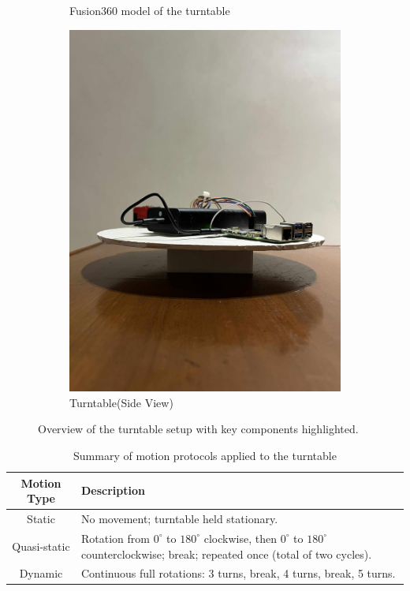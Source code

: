 \documentclass{iutbscthesis}
\begin{document}
\begin{figure}[h!]
\begin{subfigure}[b]{0.3\textwidth}
        \caption{Fusion360 model of the turntable}
        \label{fig:turntable_fusion}
    \end{subfigure}
    \hfill
    \begin{subfigure}[b]{0.3\textwidth}
        \centering
        \includegraphics[width=\textwidth]{Turntable_side.jpg}
        \caption{Turntable(Side View)}
        \label{fig:no disk}
    \end{subfigure}
    \caption{Overview of the turntable setup with key components highlighted.}
    \label{fig:turntable_overview}
\end{figure}


\begin{table}[h!] \label{tab:motion_protocols}
\centering
\caption{Summary of motion protocols applied to the turntable}
    \begin{tabular}{|c|p{10cm}|}
    \hline
    \textbf{Motion Type} & \textbf{Description} \\
    \hline
    Static & No movement; turntable held stationary. \\
    \hline
    Quasi-static & Rotation from $0^{\circ}$ to $180^{\circ}$ clockwise, then $0^{\circ}$ to $180^{\circ}$ counterclockwise; break; repeated once (total of two cycles). \\
    \hline
    Dynamic & Continuous full rotations: 3 turns, break, 4 turns, break, 5 turns. \\
    \hline
    \end{tabular}
\end{table}
\end{document}
